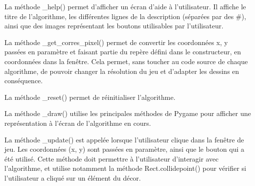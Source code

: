 \documentclass{scrreprt}
\begin{document}
La méthode \_help() permet d'afficher un écran d'aide à l'utilisateur. Il affiche
 le titre de l'algorithme, les différentes lignes de la description (séparées par
 des \#), ainsi que des images représentant les boutons utilisables par l'utilisateur.

La méthode \_get\_corres\_pixel() permet de convertir les coordonnées x, y passées
 en paramètre et faisant partie du repère défini dans le constructeur, en coordonnées
 dans la fenêtre. Cela permet, sans toucher au code source de chaque algorithme, de
 pouvoir changer la résolution du jeu et d'adapter les dessins en conséquence.

La méthode \_reset() permet de réinitialiser l'algorithme.

La méthode \_draw() utilise les principales méthodes de Pygame pour afficher une
 représentation à l'écran de l'algorithme en cours.

La méthode \_update() est appelée lorsque l'utilisateur clique dans la fenêtre de jeu.
 Les coordonnées (x, y) sont passées en paramètre, ainsi que le bouton qui a été utilisé.
 Cette méthode doit permettre à l'utilisateur d'interagir avec l'algorithme, et utilise
 notamment la méthode Rect.collidepoint() pour vérifier si l'utilisateur a cliqué sur
 un élément du décor.
\end{document}
